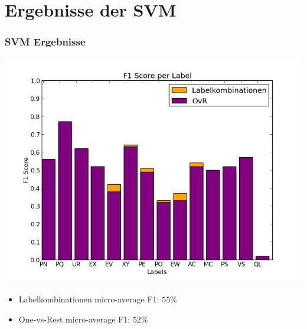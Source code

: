\documentclass[12pt, xcolor=table]{beamer}
\begin{document}
\section{Ergebnisse der SVM}
\begin{frame}
    \frametitle{SVM Ergebnisse}
    \begin{center}
        \includegraphics[scale=0.4]{figures/svm_plot.png}
    \end{center}
    \begin{itemize}
        \item Labelkombinationen micro-average F1: $55 \%$
        \item One-vs-Rest micro-average F1: $52 \%$
    \end{itemize}
\end{frame}

\end{document}
